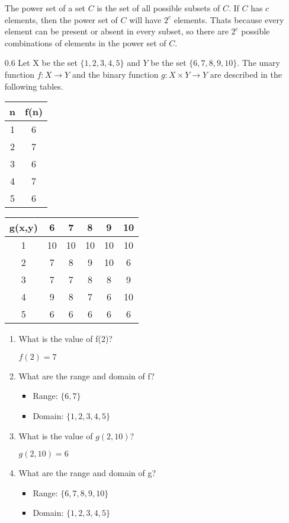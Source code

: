 \documentclass[12pt, a4paper]{article}
\begin{document}
\begin{enumerate}
The power set of a set $C$ is the set of all possible subsets of $C$. If $C$ has $c$ elements, then the power set of $C$ will have $2^c$ elements. Thats  because every element can be present or absent in every subset, so there are $2^c$ possible combinations of elements in the power set of $C$.

    \item[0.6]
Let X be the set $\{1, 2, 3, 4, 5\}$ and $Y$ be the set $\{6, 7, 8, 9, 10\}$. The unary function $f: X \to Y$ and the binary function $g: X \times Y \to Y$ are described in the following tables.

\begin{tabular}{ c | c }
    n & f(n) \\
    \hline
    1 & 6 \\
    2 & 7 \\
    3 & 6 \\
    4 & 7 \\
    5 & 6 \\
\end{tabular}
\begin{tabular}{ c | c | c | c | c | c }
    g(x,y) & 6 & 7 & 8 & 9 & 10 \\
    \hline
    1 & 10 & 10 & 10 & 10 & 10 \\
    2 & 7 & 8 & 9 & 10 & 6 \\
    3 & 7 & 7 & 8 & 8 & 9 \\
    4 & 9 & 8 & 7 & 6 & 10 \\
    5 & 6 & 6 & 6 & 6 & 6 \\
\end{tabular}
\begin{enumerate}
\item What is the value of f(2)? 

    $f(2) = 7$
\item What are the range and domain of f?
\begin{itemize}
    \item Range: $\{6, 7\}$
    \item Domain: $\{1, 2, 3, 4, 5\}$
\end{itemize}

\item What is the value of $g(2, 10)$?

    $g(2, 10) = 6$
\item What are the range and domain of g?
\begin{itemize}
    \item Range: $\{6, 7, 8, 9, 10\}$
    \item Domain: $\{1, 2, 3, 4, 5\}$
\end{itemize}


\end{enumerate}
\end{enumerate}
\end{document}
